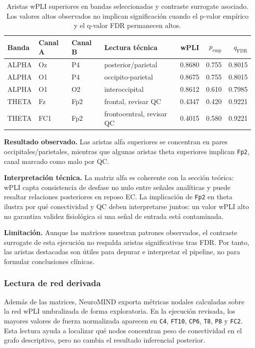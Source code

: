 \begin{table}[H]
\centering
\caption{Aristas wPLI superiores en bandas seleccionadas y contraste surrogate asociado. Los valores altos observados no implican significación cuando el p-valor empírico y el q-valor FDR permanecen altos.}
\label{tab:results-top-wpli-edges}
\begin{tabular}{llllrrr}
\toprule
Banda & Canal A & Canal B & Lectura técnica & wPLI & $p_{\mathrm{emp}}$ & $q_{\mathrm{FDR}}$ \\
\midrule
ALPHA & Oz & P4 & posterior/parietal & 0.8680 & 0.755 & 0.8015 \\
ALPHA & O1 & P4 & occipito-parietal & 0.8675 & 0.755 & 0.8015 \\
ALPHA & O1 & O2 & interoccipital & 0.8612 & 0.610 & 0.7985 \\
THETA & Fz & Fp2 & frontal, revisar QC & 0.4347 & 0.420 & 0.9221 \\
THETA & FC1 & Fp2 & frontocentral, revisar QC & 0.4015 & 0.580 & 0.9221 \\
\bottomrule
\end{tabular}
\end{table}

\textbf{Resultado observado.} Las aristas alfa superiores se concentran en pares occipitales/parietales, mientras que algunas aristas theta superiores implican \texttt{Fp2}, canal marcado como malo por QC.

\textbf{Interpretación técnica.} La matriz alfa es coherente con la sección teórica: wPLI capta consistencia de desfase no nulo entre señales analíticas y puede resaltar relaciones posteriores en reposo EC. La implicación de \texttt{Fp2} en theta ilustra por qué conectividad y QC deben interpretarse juntos: un valor wPLI alto no garantiza validez fisiológica si una señal de entrada está contaminada.

\textbf{Limitación.} Aunque las matrices muestran patrones observados, el contraste surrogate de esta ejecución no respalda aristas significativas tras FDR. Por tanto, las aristas destacadas son útiles para depurar e interpretar el pipeline, no para formular conclusiones clínicas.

\subsubsection*{Lectura de red derivada}

Además de las matrices, NeuroMIND exporta métricas nodales calculadas sobre la red wPLI umbralizada de forma exploratoria. En la ejecución revisada, los mayores valores de fuerza normalizada aparecen en \texttt{C4}, \texttt{FT10}, \texttt{CP6}, \texttt{T8}, \texttt{P8} y \texttt{FC2}. Esta lectura ayuda a localizar qué nodos concentran peso de conectividad en el grafo descriptivo, pero no cambia el resultado inferencial posterior.


